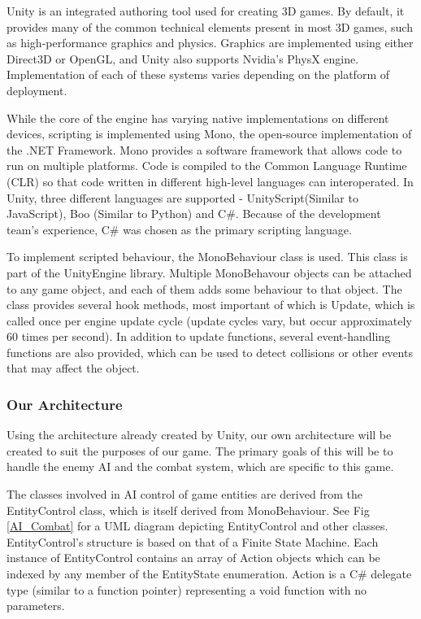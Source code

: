 \documentclass{article}
\begin{document}
Unity is an integrated authoring tool used for creating 3D games.  By default, it provides many of the common technical elements present in most 3D games, such as high-performance graphics and physics.  Graphics are implemented using either Direct3D or OpenGL, and Unity also supports Nvidia's PhysX engine.  Implementation of each of these systems varies depending on the platform of deployment.

While the core of the engine has varying native implementations on different devices, scripting is implemented using Mono, the open-source implementation of the .NET Framework.  Mono provides a software framework that allows code to run on multiple platforms.  Code is compiled to the Common Language Runtime (CLR) so that code written in different high-level languages can interoperated.  In Unity, three different languages are supported - UnityScript(Similar to JavaScript), Boo (Similar to Python) and C\#.  Because of the development team's experience, C\# was chosen as the primary scripting language.

To implement scripted behaviour, the MonoBehaviour class is used.  This class is part of the UnityEngine library.  Multiple MonoBehavour objects can be attached to any game object, and each of them adds some behaviour to that object.  The class provides several hook methods, most important of which is Update, which is called once per engine update cycle (update cycles vary, but occur approximately 60 times per second).  In addition to update functions, several event-handling functions are also provided, which can be used to detect collisions or other  events that may affect the object.

\subsubsection{Our Architecture}

Using the architecture already created by Unity, our own architecture will be created to suit the purposes of our game.  The primary goals of this will be to handle the enemy AI and the combat system, which are specific to this game.

The classes involved in AI control of game entities are derived from the EntityControl class, which is itself derived from MonoBehaviour.  See Fig \ref{AI_Combat} for a UML diagram depicting EntityControl and other classes.  EntityControl's structure is based on that of a Finite State Machine.  Each instance of EntityControl contains an array of Action objects which can be indexed by any member of the EntityState enumeration.  Action is a C\# delegate type (similar to a function pointer) representing a void function with no parameters.
\end{document}
